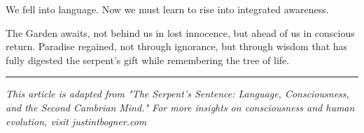 \documentclass[10pt,twocolumn]{article}
\begin{document}
We fell into language. Now we must learn to rise into integrated awareness.

The Garden awaits, not behind us in lost innocence, but ahead of us in conscious return. Paradise regained, not through ignorance, but through wisdom that has fully digested the serpent's gift while remembering the tree of life.

\vfill

\begin{center}
\color{gardengreen}\rule{0.5\linewidth}{0.4pt}

\textit{This article is adapted from "The Serpent's Sentence: Language, Consciousness, and the Second Cambrian Mind." For more insights on consciousness and human evolution, visit justintbogner.com}
\end{center}
\end{document}
